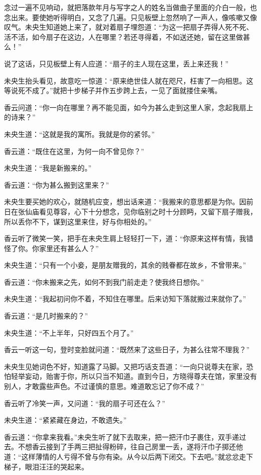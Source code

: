 \documentclass[a4paper,12pt,UTF8,twoside]{ctexbook}
\begin{document}
念过一遍不见响动，就把落款年月与写字之人的姓名当做曲子里面的介白一般，也念出来。要使她听得明白，又念了几遍。只见板壁上忽然响了一声人，像咳嗽又像叹气。未央生知道她上来了，就对着扇子埋怨道：“为这一把扇子弄得人死不死、活不活，如今扇子在这边，人在哪里？若还寻得着，不如送还她，留在这里做甚么！”

说了这话，只见板壁上有人应道：“扇子的主人现在这里，丢上来还我！”

未央生抬头看见，故意吃一惊道：“原来绝世佳人就在咫尺，枉害了一向相思。这等说死不成了。”就把十步梯子并作五步跨上去，一见了面就搂住亲嘴。

香云问道：“你一向在哪里？再不能见面，如今为甚么走到这里人家，念起我扇上的诗来？”

未央生道：“这就是我的寓所。我就是你的紧邻。”

香云道：“既住在这里，为何一向不曾见你？”

未央生道：“我是新搬来的。”

香云道：“你为甚么搬到这里来？”

未央生要买她的欢心，就随机应变，想出话来道：“我搬来的意思都是为你。因前日在张仙庙看见尊容，心下十分想念，见你临别之时十分顾眄，又留下扇子赠我，所以丢你不下，谋到这里来住，好与你相处的。”

香云听了微笑一笑，把手在未央生肩上轻轻打一下，道：“你原来这样有情，我错怪了你。你家里还有甚么人？”

未央生道：“只有一个小妾，是朋友赠我的，其余的贱眷都在故乡，不曾带来。”

香云道：“你未搬来之先，如何不到我门前走走？使我终日想你。”

未央生道：“我起初问你不着，不知住在哪里。后来访知下落就搬过来就你了。”

香云道：“是几时搬来的？”

未央生道：“不上半年，只好四五个月了。”

香云一听这一句，登时变脸就问道：“既然来了这些日子，为甚么往常不理我？”

未央生见她词色不好，知道露了马脚。又把巧话支吾道：“一向只说尊夫在家，恐怕轻举妄动，贻害于你，所以只当不知道。直到今日，方晓得尊夫在馆，家里没有别人，才敢露些声色。不过谨慎的意思。难道敢忘记了你不成？”

香云听了冷笑一声，又问道：“我的扇子可还在么？”

未央生道：“紧紧藏在身边，不敢遗失。”

香云道：“你拿来我看。”未央生听了就下去取来，把一把汗巾子裹住，双手递过去。不想香云接到了手两三把扯得粉碎，往自己房里一丢，遂将汗巾子掷还他道：“这样薄情的人亏得不曾与你有染。从今以后两下闭交。下去吧。”就忿忿走下梯子，眼泪汪汪的哭起来。
\end{document}
